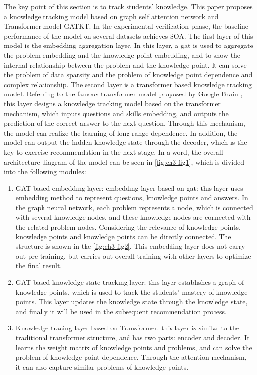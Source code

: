 The key point of this section is to track students' knowledge. This paper proposes a knowledge tracking model based on graph self attention network and Transformer model GATKT. In the experimental verification phase, the baseline performance of the model on several datasets achieves SOA. The first layer of this model is the embedding aggregation layer. In this layer, a gat is used to aggregate the problem embedding and the knowledge point embedding, and to show the internal relationship between the problem and the knowledge point. It can solve the problem of data sparsity and the problem of knowledge point dependence and complex relationship. The second layer is a transformer based knowledge tracking model. Referring to the famous transformer model proposed by Google Brain \cite{vaswani2017attention}, this layer designs a knowledge tracking model based on the transformer mechanism, which inputs questions and skills embedding, and outputs the prediction of the correct answer to the next question. Through this mechanism, the model can realize the learning of long range dependence. In addition, the model can output the hidden knowledge state through the decoder, which is the key to exercise recommendation in the next stage. In a word, the overall architecture diagram of the model can be seen in \figurename{\ref{fig:ch3-fig1}}, which is divided into the following modules:
\begin{enumerate}
	\item GAT-based embedding layer: embedding layer based on gat: this layer uses embedding method to represent questions, knowledge points and answers. In the graph neural network, each problem represents a node, which is connected with several knowledge nodes, and these knowledge nodes are connected with the related problem nodes. Considering the relevance of knowledge points, knowledge points and knowledge points can be directly connected. The structure is shown in the \figurename{\ref{fig:ch3-fig2}}. This embedding layer does not carry out pre training, but carries out overall training with other layers to optimize the final result.
	\item GAT-based knowledge state tracking layer: this layer establishes a graph of knowledge points, which is used to track the students' mastery of knowledge points. This layer updates the knowledge state through the knowledge state, and finally it will be used in the subsequent recommendation process.
	\item Knowledge tracing layer based on Transformer: this layer is similar to the traditional transformer structure, and has two parts: encoder and decoder. It learns the weight matrix of knowledge points and problems, and can solve the problem of knowledge point dependence. Through the attention mechanism, it can also capture similar problems of knowledge points.
\end{enumerate}

